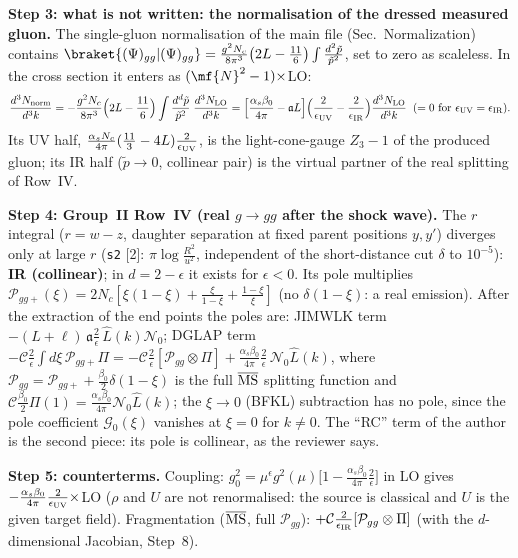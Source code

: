 \medskip
\noindent\textbf{Step 3: what is not written: the normalisation of the dressed measured gluon.} The single-gluon normalisation of the main file (Sec.~Normalization) contains $\braket{(\Psi)_{gg}|(\Psi)_{gg}}=\frac{g^{2}N_{c}}{8\pi^{3}}\big(2L-\frac{11}{6}\big)\int\frac{d^{2}\tilde p}{\tilde p^{2}}$, set to zero as scaleless. In the cross section it enters as $(\mf{N}^{2}-1)\times$LO:
\begin{align}
\frac{d^{3}N_{\rm norm}}{d^{3}k}=-\frac{g^{2}N_{c}}{8\pi^{3}}\Big(2L-\frac{11}{6}\Big)\int\frac{d^{d}\tilde p}{\tilde p^{2}}\;\frac{d^{3}N_{\rm LO}}{d^{3}k}
=\Big[\frac{\alpha_{s}\beta_{0}}{4\pi}-\mathfrak{a}L\Big]\Big(\frac{2}{\epsilon_{\rm UV}}-\frac{2}{\epsilon_{\rm IR}}\Big)\frac{d^{3}N_{\rm LO}}{d^{3}k}\;\;(=0\text{ for }\epsilon_{\rm UV}=\epsilon_{\rm IR}).
\label{eq:pd-norm}
\end{align}
Its UV half, $\frac{\alpha_{s}N_{c}}{4\pi}(\frac{11}{3}-4L)\frac{2}{\epsilon_{\rm UV}}$, is the light-cone-gauge $Z_{3}-1$ of the produced gluon; its IR half ($\tilde p\to0$, collinear pair) is the virtual partner of the real splitting of Row~IV.

\medskip
\noindent\textbf{Step 4: Group~II Row~IV (real $g\to gg$ after the shock wave).} The $r$ integral ($r=w-z$, daughter separation at fixed parent positions $y,y'$) diverges only at large $r$ (\texttt{s2} [2]: $\pi\log\frac{R^{2}}{u^{2}}$, independent of the short-distance cut $\delta$ to $10^{-5}$): \textbf{IR (collinear)}; in $d=2-\epsilon$ it exists for $\epsilon<0$. Its pole multiplies $\mathcal{P}_{gg+}(\xi)=2N_{c}[\xi(1-\xi)+\frac{\xi}{1-\xi}+\frac{1-\xi}{\xi}]$ (no $\delta(1-\xi)$: a real emission). After the extraction of the end points the poles are: JIMWLK term $-(L+\ell)\,\mathfrak{a}\frac{2}{\epsilon}\,\widehat{L}(k)\mathcal{N}_{0}$; DGLAP term $-\mathcal{C}\frac{2}{\epsilon}\int d\xi\,\mathcal{P}_{gg+}\Pi=-\mathcal{C}\frac{2}{\epsilon}[\mathcal{P}_{gg}\otimes\Pi]+\frac{\alpha_{s}\beta_{0}}{4\pi}\frac{2}{\epsilon}\,\mathcal{N}_{0}\widehat{L}(k)$, where $\mathcal{P}_{gg}=\mathcal{P}_{gg+}+\frac{\beta_{0}}{2}\delta(1-\xi)$ is the full $\overline{\rm MS}$ splitting function and $\mathcal{C}\frac{\beta_{0}}{2}\Pi(1)=\frac{\alpha_{s}\beta_{0}}{4\pi}\mathcal{N}_{0}\widehat{L}(k)$; the $\xi\to0$ (BFKL) subtraction has no pole, since the pole coefficient $\mathcal{G}_{0}(\xi)$ vanishes at $\xi=0$ for $k\neq0$. The ``RC'' term of the author is the second piece: its pole is collinear, as the reviewer says.

\medskip
\noindent\textbf{Step 5: counterterms.} Coupling: $g_{0}^{2}=\mu^{\epsilon}g^{2}(\mu)\big[1-\frac{\alpha_{s}\beta_{0}}{4\pi}\frac{2}{\epsilon}\big]$ in LO gives $-\frac{\alpha_{s}\beta_{0}}{4\pi}\frac{2}{\epsilon_{\rm UV}}\times$LO ($\rho$ and $U$ are not renormalised: the source is classical and $U$ is the given target field). Fragmentation ($\overline{\rm MS}$, full $\mathcal{P}_{gg}$): $+\mathcal{C}\frac{2}{\epsilon_{\rm IR}}[\mathcal{P}_{gg}\otimes\Pi]$ (with the $d$-dimensional Jacobian, Step~8).


